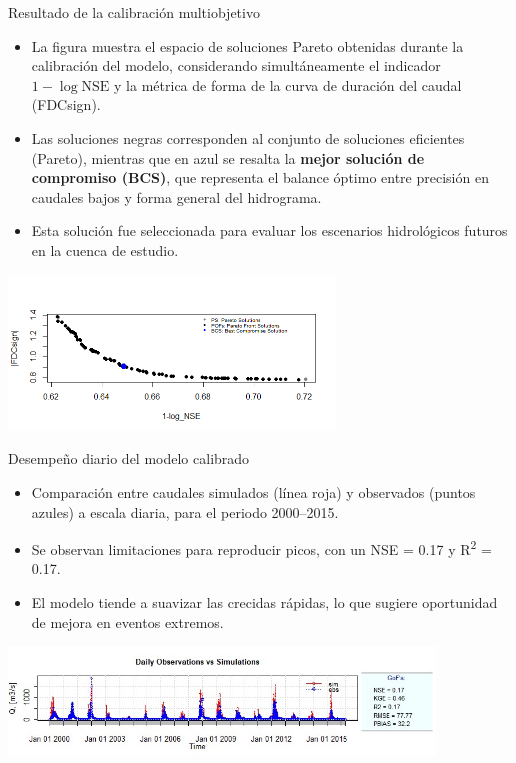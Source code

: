\documentclass{beamer}
\begin{document}
\begin{frame}{Resultado de la calibración multiobjetivo}
  \small
  \begin{itemize}
    \item La figura muestra el espacio de soluciones Pareto obtenidas durante la calibración del modelo, considerando simultáneamente el indicador $1 - \log\text{NSE}$ y la métrica de forma de la curva de duración del caudal (FDCsign).
    \item Las soluciones negras corresponden al conjunto de soluciones eficientes (Pareto), mientras que en azul se resalta la \textbf{mejor solución de compromiso (BCS)}, que representa el balance óptimo entre precisión en caudales bajos y forma general del hidrograma.
    \item Esta solución fue seleccionada para evaluar los escenarios hidrológicos futuros en la cuenca de estudio.
  \end{itemize}
  \vspace{0.1cm}
  \begin{center}
    \includegraphics[width=0.65\textwidth]{Optimizacion.png}
  \end{center}
\end{frame}

\begin{frame}{Desempeño diario del modelo calibrado}
  \small
  \begin{itemize}
    \item Comparación entre caudales simulados (línea roja) y observados (puntos azules) a escala diaria, para el periodo 2000–2015.
    \item Se observan limitaciones para reproducir picos, con un NSE = 0.17 y R\textsuperscript{2} = 0.17.
    \item El modelo tiende a suavizar las crecidas rápidas, lo que sugiere oportunidad de mejora en eventos extremos.
  \end{itemize}
  \vspace{0.2cm}
  \begin{center}
    \includegraphics[width=0.85\textwidth]{calibracion_actual_diaria.png}
  \end{center}
\end{frame}
\end{document}
